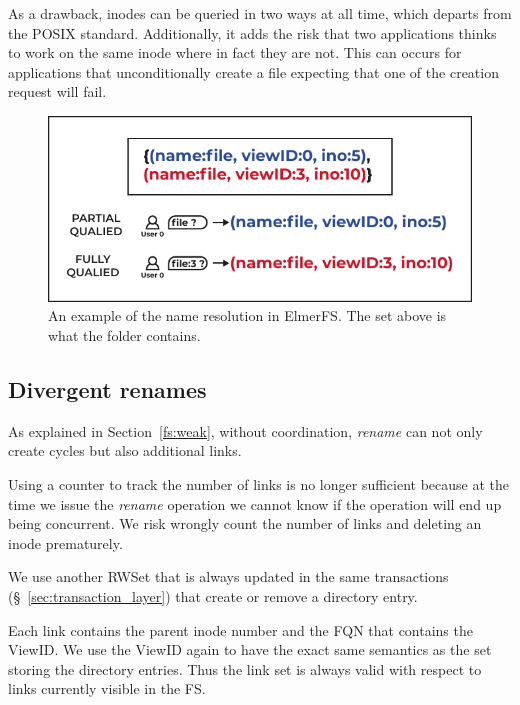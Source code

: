 \documentclass[sigconf, 10pt]{acmart}
\begin{document}
As a drawback, inodes can be queried in two ways at all time, which departs from the POSIX standard. Additionally, it adds the risk
that two applications thinks to work on the same inode where in fact they are not. This can occurs for applications that unconditionally create a file
expecting that one of the creation request will fail.

\begin{figure}[h]
	\caption{An example of the name resolution in ElmerFS. The set above is
	what the folder contains.}
	\label{fig:fqn}
	\centering
	\includegraphics[scale=0.6]{Le-bonhomme-sait-pas-ce-quil-veut.pdf}
\end{figure}


\subsection{Divergent renames}

As explained in Section~\ref{fs:weak}, without coordination, \textit{rename} can not only create
cycles but also additional links.

Using a counter to track the number of links is no longer sufficient because at the time we issue
the \textit{rename} operation we cannot know if the operation will end up being concurrent. We
risk wrongly count the number of links and deleting an inode prematurely.

We use another RWSet that is always updated in the same transactions (\S~\ref{sec:transaction_layer}) that create or remove
a directory entry.

Each link contains the parent inode number and the FQN that contains the ViewID.
We use the ViewID again to have the exact same semantics as the set storing
the directory entries. Thus the link set is always valid with respect to
links currently visible in the FS.
\end{document}
